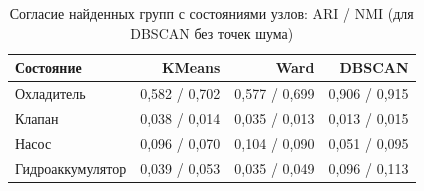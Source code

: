 \begin{table}[H]
\centering
\small
\caption{Согласие найденных групп с состояниями узлов: ARI / NMI (для DBSCAN без точек шума)}\label{tab:match}
\begin{tabular}{lrrr}
\toprule
Состояние & KMeans & Ward & DBSCAN \\
\midrule
Охладитель & 0,582 / 0,702 & 0,577 / 0,699 & 0,906 / 0,915 \\
Клапан & 0,038 / 0,014 & 0,035 / 0,013 & 0,013 / 0,015 \\
Насос & 0,096 / 0,070 & 0,104 / 0,090 & 0,051 / 0,095 \\
Гидроаккумулятор & 0,039 / 0,053 & 0,035 / 0,049 & 0,096 / 0,113 \\
\bottomrule
\end{tabular}
\end{table}
